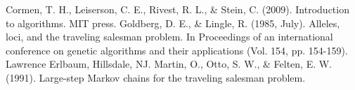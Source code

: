 \documentclass[11pt]{article}
\begin{document}
\begin{thebibliography}{9}
	Cormen, T. H., Leiserson, C. E., Rivest, R. L., \& Stein, C. (2009). Introduction to algorithms. MIT press.
	Goldberg, D. E., \& Lingle, R. (1985, July). Alleles, loci, and the traveling salesman problem. In Proceedings of an international conference on genetic algorithms and their applications (Vol. 154, pp. 154-159). Lawrence Erlbaum, Hillsdale, NJ.
	Martin, O., Otto, S. W., \& Felten, E. W. (1991). Large-step Markov chains for the traveling salesman problem.
\end{thebibliography}





\end{document}
